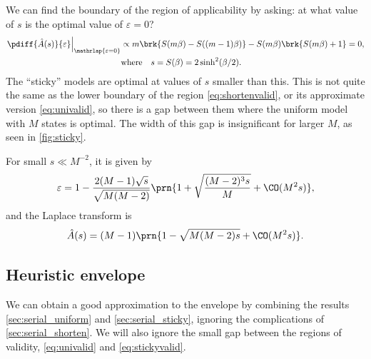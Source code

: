 \documentclass[12pt]{article}
\begin{document}
We can find the boundary of the region of applicability by asking: at what value of \(s\) is the optimal value of \(\varepsilon=0\)?
%
\begin{equation}\label{eq:stickyvalid}
\begin{aligned}
  \left.\pdiff{\hat{A}(s)}{\varepsilon}\right|_{\mathrlap{\varepsilon=0}} &\propto
    m \brk{S(m\beta) - S((m-1)\beta)} - S(m\beta) \brk{S(m\beta) + 1} = 0,\\
   &\text{where} \quad s =  S(\beta) = 2 \sinh^2(\beta/2).
\end{aligned}
\end{equation}
%
The ``sticky'' models are optimal at values of \(s\) smaller than this.
This is not quite the same as the lower boundary of the region \cref{eq:shortenvalid}, or its approximate version \cref{eq:univalid}, so there is a gap between them where the uniform model with \(M\) states is optimal.
The width of this gap is insignificant for larger \(M\), as seen in \cref{fig:sticky}.

For small \(s \ll M^{-2}\), it is given by
%
\begin{equation}\label{eq:stickyeps}
  \varepsilon = 1 - \frac{ 2(M-1)\sqrt{s} }{\sqrt{M(M-2)}} \prn{ 1 + \sqrt{\frac{(M-2)^3s}{M}} + \CO(M^2s)},
\end{equation}
%
and the Laplace transform is
%
\begin{equation}\label{eq:stickyenv}
  \hat{A}(s) = (M-1) \prn{ 1 - \sqrt{M(M-2)s} + \CO(M^2s)}.
\end{equation}
%


\subsection{Heuristic envelope}\label{sec:heuristicenv}


We can obtain a good approximation to the envelope by combining the results \cref{sec:serial_uniform} and \cref{sec:serial_sticky}, ignoring the complications of \cref{sec:serial_shorten}.
We will also ignore the small gap between the regions of validity, \eqref{eq:univalid} and \eqref{eq:stickyvalid}.
\end{document}

